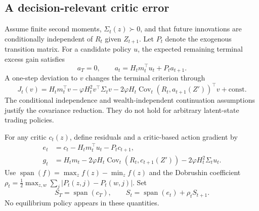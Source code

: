 \documentclass[sigconf,anonymous,review]{acmart}
\newcommand{\Cov}{\operatorname{Cov}}
\newcommand{\spn}{\operatorname{span}}
\begin{document}
\subsection{A decision-relevant critic error}
Assume finite second moments, $\Sigma_t(z)\succ0$, and that future innovations are conditionally independent of $R_t $ given $Z_{t+1}$. Let $P_t $ denote the exogenous transition matrix. For a candidate policy $u $, the expected remaining terminal excess gain satisfies
\begin{equation}\label{eq:a}
 a_T=0,\qquad a_t=H_tm_t^\top u_t+P_ta_{t+1}.
\end{equation}
A one-step deviation to $v $ changes the terminal criterion through
\begin{equation}\label{eq:local}
 J_t(v)=H_tm_t^\top v-\varphi H_t^2v^\top\Sigma_tv
 -2\varphi H_t\Cov_t(R_t,a_{t+1}(Z'))^\top v+\mathrm{const}.
\end{equation}
The conditional independence and wealth-independent continuation assumptions justify the covariance reduction. They do not hold for arbitrary latent-state trading policies.

For any critic $c_t(z)$, define residuals and a critic-based action gradient by
\begin{align}
 e_t&=c_t-H_tm_t^\top u_t-P_tc_{t+1},\label{eq:residual}\\
 g_t&=H_tm_t-2\varphi H_t\Cov_t(R_t,c_{t+1}(Z'))
       -2\varphi H_t^2\Sigma_tu_t.\label{eq:gradient}
\end{align}
Use $\spn(f)=\max_z f(z)-\min_z f(z)$ and the Dobrushin coefficient
$\rho_t=\frac12\max_{z,w}\sum_j|P_t(z,j)-P_t(w,j)|$. Set
\begin{equation}\label{eq:span}
 S_T=\spn(c_T),\qquad S_t=\spn(e_t)+\rho_tS_{t+1}.
\end{equation}
No equilibrium policy appears in these quantities.
\end{document}
